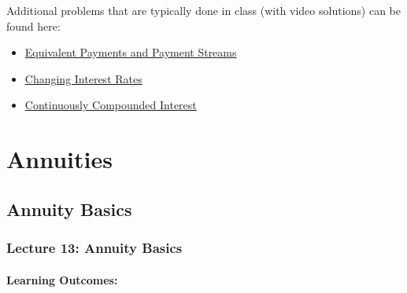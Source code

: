 \documentclass[
]{book}
\begin{document}
Additional problems that are typically done in class (with video solutions) can be found here:

\begin{itemize}
\item
  \href{https://theelementsmath.github.io/M114/compound-interest.html\#equivalent-payments-and-payment-streams}{Equivalent Payments and Payment Streams}
\item
  \href{https://theelementsmath.github.io/M114/compound-interest.html\#changing-interest-rates-1}{Changing Interest Rates}
\item
  \href{https://theelementsmath.github.io/M114/compound-interest.html\#continuously-compounded-interest}{Continuously Compounded Interest}
\end{itemize}

\part{Annuities}\label{part-annuities}

\chapter{Annuity Basics}\label{annuity-basics}

\section*{Lecture 13: Annuity Basics}\label{lecture-13-annuity-basics}

\subsection*{Learning Outcomes:}\label{learning-outcomes-12}
\end{document}
